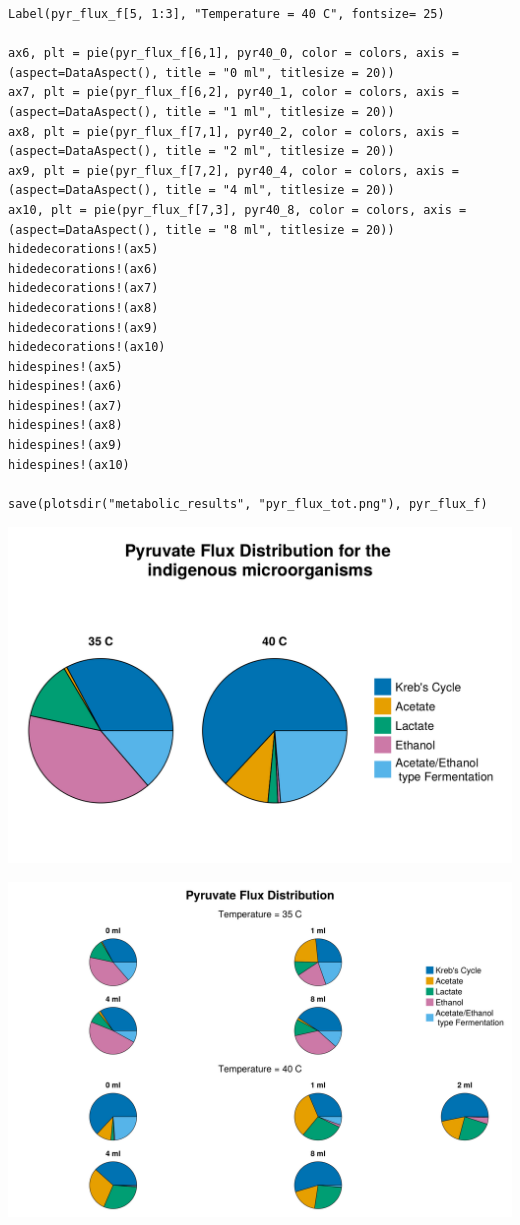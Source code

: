 \documentclass[11pt]{article}
\begin{document}
\begin{verbatim}
Label(pyr_flux_f[5, 1:3], "Temperature = 40 C", fontsize= 25)

ax6, plt = pie(pyr_flux_f[6,1], pyr40_0, color = colors, axis = (aspect=DataAspect(), title = "0 ml", titlesize = 20))
ax7, plt = pie(pyr_flux_f[6,2], pyr40_1, color = colors, axis = (aspect=DataAspect(), title = "1 ml", titlesize = 20))
ax8, plt = pie(pyr_flux_f[7,1], pyr40_2, color = colors, axis = (aspect=DataAspect(), title = "2 ml", titlesize = 20))
ax9, plt = pie(pyr_flux_f[7,2], pyr40_4, color = colors, axis = (aspect=DataAspect(), title = "4 ml", titlesize = 20))
ax10, plt = pie(pyr_flux_f[7,3], pyr40_8, color = colors, axis = (aspect=DataAspect(), title = "8 ml", titlesize = 20))
hidedecorations!(ax5)
hidedecorations!(ax6)
hidedecorations!(ax7)
hidedecorations!(ax8)
hidedecorations!(ax9)
hidedecorations!(ax10)
hidespines!(ax5)
hidespines!(ax6)
hidespines!(ax7)
hidespines!(ax8)
hidespines!(ax9)
hidespines!(ax10)

save(plotsdir("metabolic_results", "pyr_flux_tot.png"), pyr_flux_f)
\end{verbatim}

\begin{center}
\includegraphics[width=.9\linewidth]{../plots/metabolic_results/pyr_flux_ind.png}
\end{center}

\begin{center}
\includegraphics[width=.9\linewidth]{../plots/metabolic_results/pyr_flux_tot.png}
\end{center}
\end{document}
